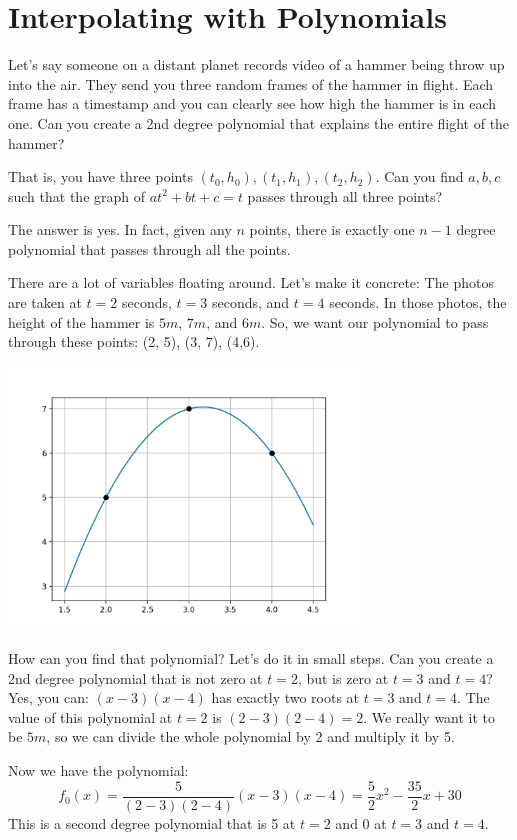 \chapter{Interpolating with Polynomials}

Let's say someone on a distant planet records video of a hammer being
throw up into the air.  They send you three random frames of the
hammer in flight. Each frame has a timestamp and you can clearly see
how high the hammer is in each one. Can you create a 2nd degree
polynomial that explains the entire flight of the hammer?

That is, you have three points $(t_0, h_0), (t_1, h_1), (t_2, h_2)$.
Can you find $a,b,c$ such that the graph of $at^2 + bt + c = t$ passes
through all three points?

The answer is yes.  In fact, given any $n$ points, there is exactly
one $n-1$ degree polynomial that passes through all the points.

There are a lot of variables floating around. Let's make it concrete:
The photos are taken at $t = 2$ seconds, $t = 3$ seconds, and $t = 4$
seconds. In those photos, the height of the hammer is $5m$, $7m$, and
$6m$. So, we want our polynomial to pass through these points: (2, 5),
(3, 7), (4,6).

\includegraphics[width=0.7\textwidth]{interpolation.png}


How can you find that polynomial? Let's do it in small steps. Can you
create a 2nd degree polynomial that is not zero at $t = 2$, but is zero
at $t = 3$ and $t = 4$? Yes, you can: $(x - 3)(x - 4)$ has
exactly two roots at $t = 3$ and $t = 4$.  The value of this polynomial at
$t = 2$ is $(2 - 3)(2 - 4) = 2$. We really want it to be $5m$, so
we can divide the whole polynomial by 2 and multiply it by 5.

Now we have the polynomial:
\begin{equation*}
f_0(x) = \frac{5}{(2 - 3)(2 - 4)}(x - 3)(x - 4) = \frac{5}{2}x^2 - \frac{35}{2}x + 30
\end{equation*}
This is a second degree polynomial that is 5 at $t=2$ and 0 at $t=3$ and $t=4$.

